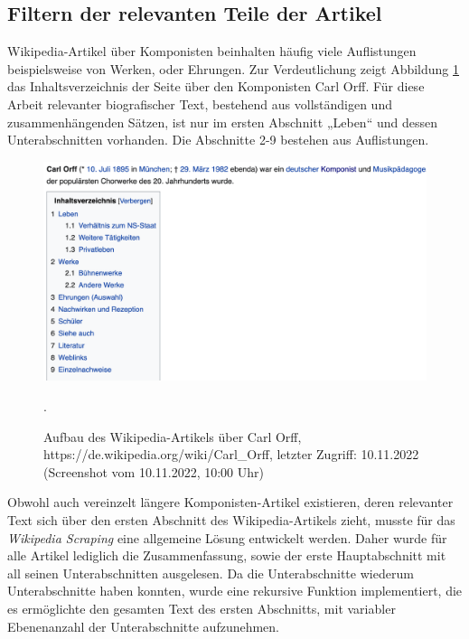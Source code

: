 \documentclass[ngerman]{ttlab-qualify}
\begin{document}
\subsection{Filtern der relevanten Teile der Artikel}
Wikipedia-Artikel über Komponisten beinhalten häufig viele Auflistungen beispielsweise von Werken, oder Ehrungen. Zur Verdeutlichung zeigt Abbildung \ref{Carl_Orff} das Inhaltsverzeichnis der Seite über den Komponisten Carl Orff. Für diese Arbeit relevanter biografischer Text, bestehend aus vollständigen und zusammenhängenden Sätzen, ist nur im ersten Abschnitt „Leben“ und dessen Unterabschnitten vorhanden. Die Abschnitte 2-9 bestehen aus Auflistungen.
\begin{figure}[H]
\begin{center}
\includegraphics[width=15cm]{grafiken/Carl_Orff_Wiki.png}
\caption[Aufbau des Wikipedia-Artikels über Carl Orff]{Aufbau des Wikipedia-Artikels über Carl Orff,\\ https://de.wikipedia.org/wiki/Carl\_Orff, letzter Zugriff: 10.11.2022 (Screenshot vom 10.11.2022, 10:00 Uhr)}.
\label{Carl_Orff}
\end{center}
\end{figure} 
\noindent Obwohl auch vereinzelt längere Komponisten-Artikel existieren, deren relevanter Text sich über den ersten Abschnitt des Wikipedia-Artikels zieht, musste für das \textit{Wikipedia Scraping} eine allgemeine Lösung entwickelt werden. Daher wurde für alle Artikel lediglich die Zusammenfassung, sowie der erste Hauptabschnitt mit all seinen Unterabschnitten ausgelesen. Da die Unterabschnitte wiederum Unterabschnitte haben konnten, wurde eine rekursive Funktion implementiert, die es ermöglichte den gesamten Text des ersten Abschnitts, mit variabler Ebenenanzahl der Unterabschnitte aufzunehmen.
\end{document}
